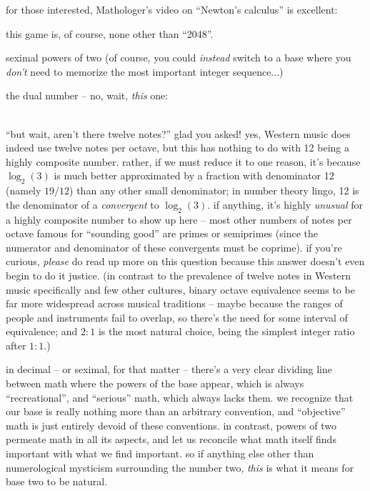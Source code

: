 \documentclass[../footnotes.tex]{subfiles}
\begin{document}
\myfootnote{} for those interested, Mathologer's video on ``Newton's calculus'' is excellent: \\

\myfootnote{} this game is, of course, none other than ``2048''.

\myfootnote{} seximal powers of two (of course, you could \emph{instead} switch to a base where you \emph{don't} need to memorize the most important integer sequence...) \\

\myfootnote{} the dual number -- no, wait, \emph{this} one: \\
 \\

\myfootnote{} ``but wait, aren't there twelve notes?'' glad you asked! yes, Western music does indeed use twelve notes per octave, but this has nothing to do with 12 being a highly composite number. rather, if we must reduce it to one reason, it's because $\log_2(3)$ is much better approximated by a fraction with denominator 12 (namely $19/12$) than any other small denominator; in number theory lingo, 12 is the denominator of a \emph{convergent} to $\log_2(3)$. if anything, it's highly \emph{unusual} for a highly composite number to show up here -- most other numbers of notes per octave famous for ``sounding good'' are primes or semiprimes (since the numerator and denominator of these convergents must be coprime). if you're curious, \emph{please} do read up more on this question because this answer doesn't even begin to do it justice. (in contrast to the prevalence of twelve notes in Western music specifically and few other cultures, binary octave equivalence seems to be far more widespread across musical traditions -- maybe because the ranges of people and instruments fail to overlap, so there's the need for some interval of equivalence; and $2:1$ is the most natural choice, being the simplest integer ratio after $1:1$.)

\myfootnote{} in decimal -- or seximal, for that matter -- there's a very clear dividing line between math where the powers of the base appear, which is always ``recreational'', and ``serious'' math, which always lacks them. we recognize that our base is really nothing more than an arbitrary convention, and ``objective'' math is just entirely devoid of these conventions. in contrast, powers of two permeate math in all its aspects, and let us reconcile what math itself finds important with what we find important. so if anything else other than numerological mysticism surrounding the number two, \emph{this} is what it means for base two to be natural.
\end{document}
